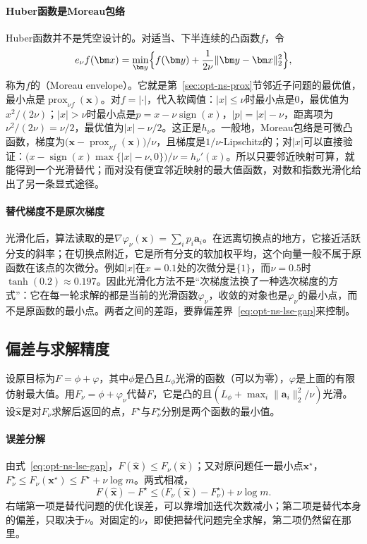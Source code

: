 \paragraph{Huber函数是Moreau包络}
Huber函数并不是凭空设计的。对适当、下半连续的凸函数$f$，令
\[
 e_\nu f(\bm x)=\min_{\bm y}\Bigl\{f(\bm y)+\frac1{2\nu}\lVert\bm y-\bm x\rVert_2^2\Bigr\},
\]
称为$f$的（Moreau envelope）。它就是第~\ref{sec:opt-ns-prox}节邻近子问题的最优值，最小点是$\operatorname{prox}_{\nu f}(\bm x)$。对$f=|\cdot|$，代入软阈值：$|x|\leq\nu$时最小点是$0$，最优值为$x^2/(2\nu)$；$|x|>\nu$时最小点是$p=x-\nu\operatorname{sign}(x)$，$|p|=|x|-\nu$，距离项为$\nu^2/(2\nu)=\nu/2$，最优值为$|x|-\nu/2$。这正是$h_\nu$。一般地，Moreau包络是可微凸函数，梯度为$\bigl(\bm x-\operatorname{prox}_{\nu f}(\bm x)\bigr)/\nu$，且梯度是$1/\nu$-Lipschitz的；对$|x|$可以直接验证：$\bigl(x-\operatorname{sign}(x)\max\{|x|-\nu,0\}\bigr)/\nu=h_\nu'(x)$。所以只要邻近映射可算，就能得到一个光滑替代；而对没有便宜邻近映射的最大值函数，对数和指数光滑化给出了另一条显式途径。

\paragraph{替代梯度不是原次梯度}
光滑化后，算法读取的是$\nabla\varphi_\nu(\bm x)=\sum_ip_i\bm a_i$。在远离切换点的地方，它接近活跃分支的斜率；在切换点附近，它是所有分支的软加权平均，这个向量一般不属于原函数在该点的次微分。例如$|x|$在$x=0.1$处的次微分是$\{1\}$，而$\nu=0.5$时$\tanh(0.2)\approx0.197$。因此光滑化方法不是“次梯度法换了一种选次梯度的方式”：它在每一轮求解的都是当前的光滑函数$\varphi_\nu$，收敛的对象也是$\varphi_\nu$的最小点，而不是原函数的最小点。两者之间的差距，要靠偏差界~\eqref{eq:opt-ns-lse-gap}来控制。

\subsection{偏差与求解精度}
\label{sec:opt-ns-smoothing-budget}

设原目标为$F=\phi+\varphi$，其中$\phi$是凸且$L_\phi$光滑的函数（可以为零），$\varphi$是上面的有限仿射最大值。用$F_\nu=\phi+\varphi_\nu$代替$F$，它是凸的且$(L_\phi+\max_i\lVert\bm a_i\rVert_2^2/\nu)$光滑。设$\widehat{\bm x}$是对$F_\nu$求解后返回的点，$F^\star$与$F_\nu^\star$分别是两个函数的最小值。

\paragraph{误差分解}
由式~\eqref{eq:opt-ns-lse-gap}，$F(\widehat{\bm x})\leq F_\nu(\widehat{\bm x})$；又对原问题任一最小点$\bm x^\star$，$F_\nu^\star\leq F_\nu(\bm x^\star)\leq F^\star+\nu\log m$。两式相减，
\begin{equation}
 F(\widehat{\bm x})-F^\star\leq\bigl(F_\nu(\widehat{\bm x})-F_\nu^\star\bigr)+\nu\log m .
 \label{eq:opt-ns-smoothing-split}
\end{equation}
右端第一项是替代问题的优化误差，可以靠增加迭代次数减小；第二项是替代本身的偏差，只取决于$\nu$。对固定的$\nu$，即使把替代问题完全求解，第二项仍然留在那里。

